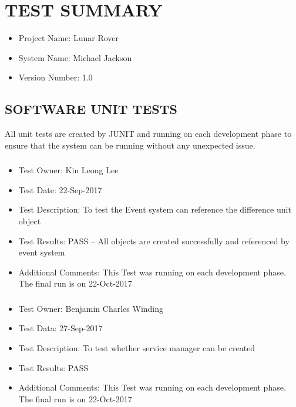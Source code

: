 \documentclass[10pt,a4paper,titlepage]{article}
\begin{document}
	\section{TEST SUMMARY}
\begin{itemize}
\item Project Name:  Lunar Rover
\item System Name: Michael Jackson
\item Version Number: 1.0
\end{itemize}
	\subsection{SOFTWARE UNIT TESTS}
	All unit tests are created by JUNIT and running on each development phase to ensure that the system can be running without any unexpected issue.
	\subsubsection{}
	\begin{itemize}
\item Test Owner:  Kin Leong Lee
\item Test Date: 22-Sep-2017
\item Test Description: To test the Event system can reference the difference unit object
\item Test Results: PASS – All objects are created successfully and referenced by event system
\item Additional Comments: This Test was running on each development phase. The final run is on 22-Oct-2017
	\end{itemize}

	\subsubsection{}
\begin{itemize}
\item Test Owner: Benjamin Charles Winding
\item Test Data: 27-Sep-2017
\item Test Description: To test whether service manager can be created
\item Test Results: PASS
\item Additional Comments: This Test was running on each development phase. The final run is on 22-Oct-2017
\end{itemize}
\end{document}
